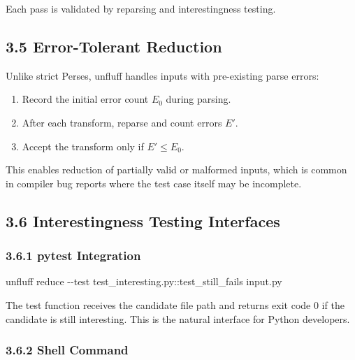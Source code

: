 \documentclass[
  letterpaper,
]{article}
\newenvironment{Shaded}{\begin{snugshade}}{\end{snugshade}}
\newcommand{\AttributeTok}[1]{\textcolor[rgb]{0.40,0.45,0.13}{#1}}
\newcommand{\ExtensionTok}[1]{\textcolor[rgb]{0.00,0.23,0.31}{#1}}
\newcommand{\NormalTok}[1]{\textcolor[rgb]{0.00,0.23,0.31}{#1}}
\providecommand{\tightlist}{%
  \setlength{\itemsep}{0pt}\setlength{\parskip}{0pt}}
\begin{document}
Each pass is validated by reparsing and interestingness testing.

\subsection{3.5 Error-Tolerant
Reduction}\label{error-tolerant-reduction}

Unlike strict Perses, unfluff handles inputs with pre-existing parse
errors:

\begin{enumerate}
\def\labelenumi{\arabic{enumi}.}
\tightlist
\item
  Record the initial error count \(E_0\) during parsing.
\item
  After each transform, reparse and count errors \(E'\).
\item
  Accept the transform only if \(E' \leq E_0\).
\end{enumerate}

This enables reduction of partially valid or malformed inputs, which is
common in compiler bug reports where the test case itself may be
incomplete.

\subsection{3.6 Interestingness Testing
Interfaces}\label{interestingness-testing-interfaces}

\subsubsection{3.6.1 pytest Integration}\label{pytest-integration}

\begin{Shaded}
\begin{Highlighting}[]
\ExtensionTok{unfluff}\NormalTok{ reduce }\AttributeTok{{-}{-}test}\NormalTok{ test\_interesting.py::test\_still\_fails input.py}
\end{Highlighting}
\end{Shaded}

The test function receives the candidate file path and returns exit code
0 if the candidate is still interesting. This is the natural interface
for Python developers.

\subsubsection{3.6.2 Shell Command}\label{shell-command}
\end{document}
